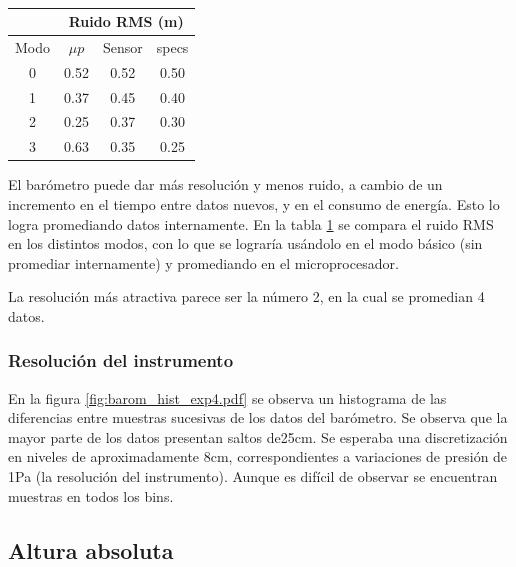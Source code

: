 \documentclass[main]{subfiles}
\begin{document}
\begin{table}
\vspace{-20pt}
\centering
\begin{tabular}{c|c|c|c|} 
\cline{2-4}
	& \multicolumn{3}{|c|}{\cellcolor[gray]{0.8} Ruido RMS  (m)}      \\ \hline
\multicolumn{1}{|c|}{\cellcolor[gray]{0.8} {Modo}} & \cellcolor[gray]{0.8} {$\mu p$} &\cellcolor[gray]{0.8} {Sensor} &\cellcolor[gray]{0.8} {specs}\\ \hline

\multicolumn{1}{|c|}{0}	&	0.52	&	0.52	&	0.50\\
\hline
\multicolumn{1}{|c|}{1}	&	0.37	&	0.45	&	0.40\\
\hline
\multicolumn{1}{|c|}{2}	&	0.25	&	0.37	&	0.30\\
\hline
\multicolumn{1}{|c|}{3}	&	0.63	&	0.35	&	0.25\\
\hline

\end{tabular}
\caption{}
\vspace{-16pt}
\label{tab:ruido-rms}
\end{table}

El bar\'ometro puede dar m\'as resoluci\'on y menos ruido, a cambio de un incremento en el tiempo entre datos nuevos, y en el consumo de energ\'ia. Esto lo logra promediando datos internamente. En la tabla \ref{tab:ruido-rms} se compara el ruido RMS en los distintos modos, con lo que se lograr\'ia us\'andolo en el modo b\'asico (sin promediar internamente) y promediando en el microprocesador.

La resoluci\'on m\'as atractiva parece ser la n\'umero 2, en la cual se promedian 4 datos.

\subsubsection{Resoluci\'on del instrumento}

En la figura \ref{fig:barom_hist_exp4.pdf} se observa un histograma de las diferencias entre muestras sucesivas de los datos del bar\'ometro. Se observa que la mayor parte de los datos presentan saltos de25cm. Se esperaba una discretizaci\'on en niveles de  aproximadamente 8cm, correspondientes a variaciones de presi\'on de 1Pa (la resoluci\'on del instrumento). Aunque es dif\'icil de observar se encuentran muestras en todos los bins.

\subsection{Altura absoluta}
\end{document}
